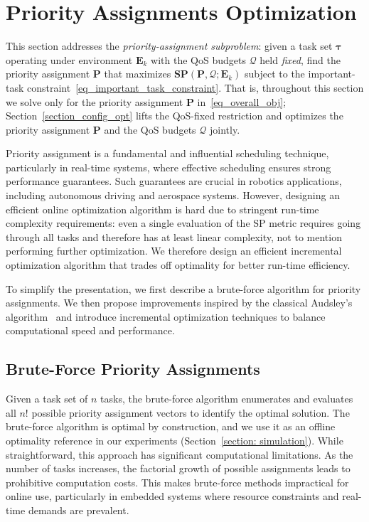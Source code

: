 	\section{Priority Assignments Optimization}
    \label{section_priority_opt}

    This section addresses the \emph{priority-assignment subproblem}: given a task set $\boldsymbol{\tau}$ operating under environment $\textbf{E}_k$ with the QoS budgets $\boldsymbol{\mathcal{Q}}$ held \emph{fixed}, find the priority assignment $\boldsymbol{P}$ that maximizes $\textbf{SP}(\boldsymbol{P}, \boldsymbol{\mathcal{Q}}; \textbf{E}_k)$ subject to the important-task constraint~\eqref{eq_important_task_constraint}.
    That is, throughout this section we solve only for the priority assignment $\boldsymbol{P}$ in~\eqref{eq_overall_obj}; Section~\ref{section_config_opt} lifts the QoS-fixed restriction and optimizes the priority assignment $\boldsymbol{P}$ and the QoS budgets $\boldsymbol{\mathcal{Q}}$ jointly.

    Priority assignment is a fundamental and influential scheduling technique, particularly in real-time systems, where effective scheduling ensures strong performance guarantees.
    Such guarantees are crucial in robotics applications, including autonomous driving and aerospace systems.
    However, designing an efficient online optimization algorithm is hard due to stringent run-time complexity requirements: even a single evaluation of the SP metric requires going through all tasks and therefore has at least linear complexity, not to mention performing further optimization.
    We therefore design an efficient incremental optimization algorithm that trades off optimality for better run-time efficiency.

    To simplify the presentation, we first describe a brute-force algorithm for priority assignments.
    We then propose improvements inspired by the classical Audsley’s algorithm~\cite{Audsley91optimalpriority} and introduce incremental optimization techniques to balance computational speed and performance.


	\subsection{Brute-Force Priority Assignments}
	\label{section_bf_pa}
    Given a task set of $n$ tasks, the brute-force algorithm enumerates and evaluates all $n!$ possible priority assignment vectors to identify the optimal solution.
    The brute-force algorithm is optimal by construction, and we use it as an offline optimality reference in our experiments (Section~\ref{section: simulation}).
    While straightforward, this approach has significant computational limitations.
    As the number of tasks increases, the factorial growth of possible assignments leads to prohibitive computation costs.
    This makes brute-force methods impractical for online use, particularly in embedded systems where resource constraints and real-time demands are prevalent.



